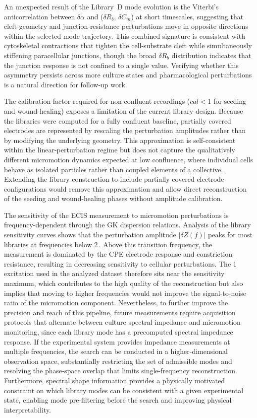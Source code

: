\documentclass[english, 10pt, a4paper]{article}
\def\SI#1#2{#1\,#2}%
\begin{document}
An unexpected result of the Library~D mode evolution is the Viterbi's anticorrelation between $\delta\alpha$ and ($\delta R_b$, $\delta C_m$) at short timescales, suggesting that cleft-geometry and junction-resistance perturbations move in opposite directions within the selected mode trajectory. This combined signature is consistent with cytoskeletal contractions that tighten the cell-substrate cleft while simultaneously stiffening paracellular junctions, though the broad $\delta R_b$ distribution indicates that the junction response is not confined to a single value. Verifying whether this asymmetry persists across more culture states and pharmacological perturbations is a natural direction for follow-up work.

The calibration factor required for non-confluent recordings ($cal < 1$ for seeding and wound-healing) exposes a limitation of the current library design. Because the libraries were computed for a fully confluent baseline, partially covered electrodes are represented by rescaling the perturbation amplitudes rather than by modifying the underlying geometry. This approximation is self-consistent within the linear-perturbation regime but does not capture the qualitatively different micromotion dynamics expected at low confluence, where individual cells behave as isolated particles rather than coupled elements of a collective. Extending the library construction to include partially covered electrode configurations would remove this approximation and allow direct reconstruction of the seeding and wound-healing phases without amplitude calibration.

The sensitivity of the ECIS measurement to micromotion perturbations is frequency-dependent through the GK dispersion relations. Analysis of the library sensitivity curves shows that the perturbation amplitude $|\delta Z(f)|$ peaks for most libraries at frequencies below \SI{2}{\kilo\hertz}. Above this transition frequency, the measurement is dominated by the CPE electrode response and constriction resistance, resulting in decreasing sensitivity to cellular perturbations. The \SI{1}{\kilo\hertz} excitation used in the analyzed dataset therefore sits near the sensitivity maximum, which contributes to the high quality of the reconstruction but also implies that moving to higher frequencies would not improve the signal-to-noise ratio of the micromotion component. Nevertheless, to further improve the precision and reach of this pipeline, future measurements require acquisition protocols that alternate between culture spectral impedance and micromotion monitoring, since each library mode has a precomputed spectral impedance response. If the experimental system provides impedance measurements at multiple frequencies, the search can be conducted in a higher-dimensional observation space, substantially restricting the set of admissible modes and resolving the phase-space overlap that limits single-frequency reconstruction. Furthermore, spectral shape information provides a physically motivated constraint on which library modes can be consistent with a given experimental state, enabling mode pre-filtering before the search and improving physical interpretability.
\end{document}
